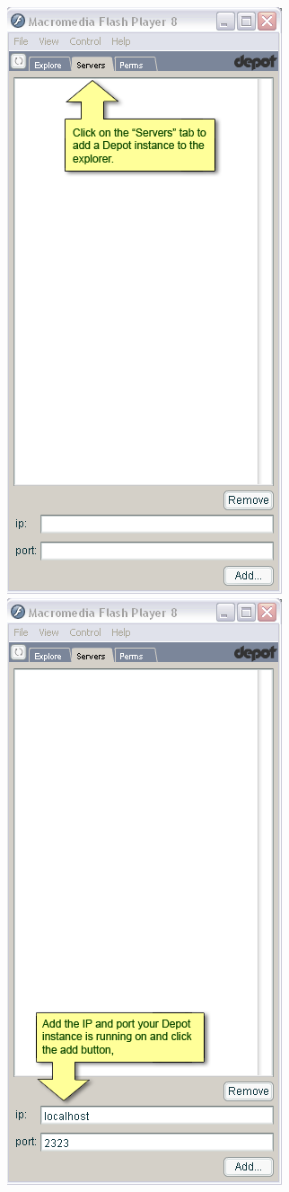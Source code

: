 \documentclass{report}
\begin{document}
\begin{center}
\includegraphics[scale=0.5]{users-images/Step2-annotated.png}
\includegraphics[scale=0.5]{users-images/Step3-annotated.png}
\end{center}
\end{document}
